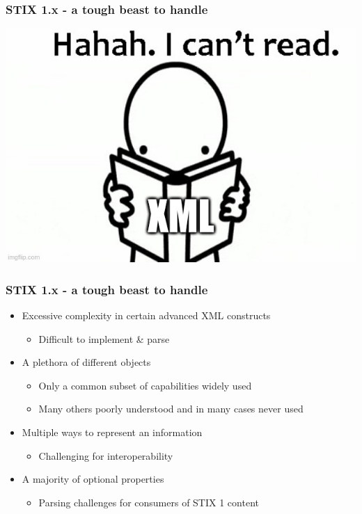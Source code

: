 \begin{frame}
    \frametitle{STIX 1.x - a tough beast to handle}
    \centering
    \includegraphics[scale=0.54]{images/xml.jpg}
\end{frame}

\begin{frame}
    \frametitle{STIX 1.x - a tough beast to handle}
    \begin{itemize}
        \item Excessive complexity in certain advanced XML constructs
        \begin{itemize}
            \item Difficult to implement \& parse
        \end{itemize}
        \item A plethora of different objects
        \begin{itemize}
            \item Only a common subset of capabilities widely used
            \item Many others poorly understood and in many cases never used 
        \end{itemize}
        \item Multiple ways to represent an information
        \begin{itemize}
            \item Challenging for interoperability
        \end{itemize}
        \item A majority of optional properties
        \begin{itemize}
            \item Parsing challenges for consumers of STIX 1 content
        \end{itemize}
    \end{itemize}
\end{frame}

